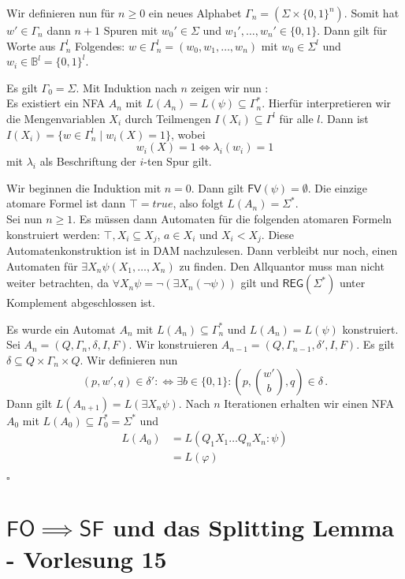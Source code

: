 \documentclass[12pt, german]{article}
\newcommand{\B}{\mathbb{B}}
\newcommand{\sigstern}{\Sigma^\ast}
\newcommand{\starfree}{\mathsf{SF}}
\newcommand{\fv}{\mathsf{FV}}
\newcommand{\fo}{\mathsf{FO}}
\newcommand{\reg}{\mathsf{REG}}
\newcommand{\bewiesen}{
	
	\begin{flushright}
		$\square$  \\
\end{flushright}}
\begin{document}
	Wir definieren nun für $n \geq 0$ ein neues Alphabet $\Gamma_n = (\Sigma \times \{0,1\}^n)$. Somit hat $w' \in \Gamma_n$ dann $n+1$ Spuren mit $w_0' \in \Sigma$ und $w_1', \ldots, w_n' \in \{0,1\}$. Dann gilt für Worte aus $\Gamma_n^l$ Folgendes:  $w \in \Gamma_n^l = (w_0, w_1, \ldots, w_n)$ mit $w_0 \in \Sigma^l$ und $w_i \in \B^l = \{0,1\}^l$. 
	\newline
	
	Es gilt $\Gamma_0 = \Sigma$. 
	Mit Induktion nach $n$ zeigen wir nun : \\
	Es existiert ein NFA $A_n$ mit $L(A_n) = L(\psi) \subseteq \Gamma_n^\ast$. Hierfür interpretieren wir die Mengenvariablen $X_i$ durch Teilmengen $I(X_i) \subseteq \Gamma^l$ für alle $l$.
	Dann ist $I(X_i) = \{w \in \Gamma_n^l \mid w_i(X)= 1\}$, wobei $$w_i(X) = 1 \iff \lambda_i(w_i) = 1$$ mit $\lambda_i$ als Beschriftung der $i$-ten Spur gilt.
	\newline
	
	Wir beginnen die Induktion mit $n= 0$. Dann gilt $\fv(\psi) = \emptyset$. Die einzige atomare Formel ist dann $\top = true$, also folgt $L(A_n) = \sigstern$.\\
	
	Sei nun $n \geq 1$. Es müssen dann Automaten für die folgenden atomaren Formeln konstruiert werden: $\top, X_i \subseteq X_j$, $a\in X_i$ und $X_i < X_j$. Diese Automatenkonstruktion ist in DAM nachzulesen.
	Dann verbleibt nur noch, einen Automaten für $\exists X_n  \psi (X_1, \ldots, X_n)$ zu finden.
	Den Allquantor muss man nicht weiter betrachten, da $\forall X_n \psi = \neg (\exists X_n(\neg\psi))$ gilt und $\reg(\sigstern)$ unter Komplement abgeschlossen ist.
	\newline 
		
	Es wurde ein Automat $A_n$ mit $L(A_n) \subseteq \Gamma_n^\ast$ und $L(A_n) = L(\psi)$ konstruiert. Sei $A_n=(Q,\Gamma_n, \delta, I, F)$. Wir konstruieren $A_{n-1} = (Q, \Gamma_{n-1}, \delta', I, F)$. 
	Es gilt $\delta \subseteq Q \times \Gamma_n \times Q$. Wir definieren nun $$(p, w ', q) \in \delta' :\iff \exists b \in \{0,1\}: (p, \binom{w'}{b}, q) \in \delta\, .$$
	Dann gilt $L(A_{n+1}) = L(\exists X_n \psi)$. Nach $n$ Iterationen erhalten wir einen NFA $A_0$ mit $L(A_0) \subseteq \Gamma_0^\ast = \sigstern$ und 
	\begin{align*}
		L(A_0) &= L(Q_1X_1\ldots Q_nX_n : \psi) \\
		&=L(\varphi)
	\end{align*}
	\bewiesen
	
\section{$\fo \implies \starfree $ und das Splitting Lemma - Vorlesung 15}
\end{document}
